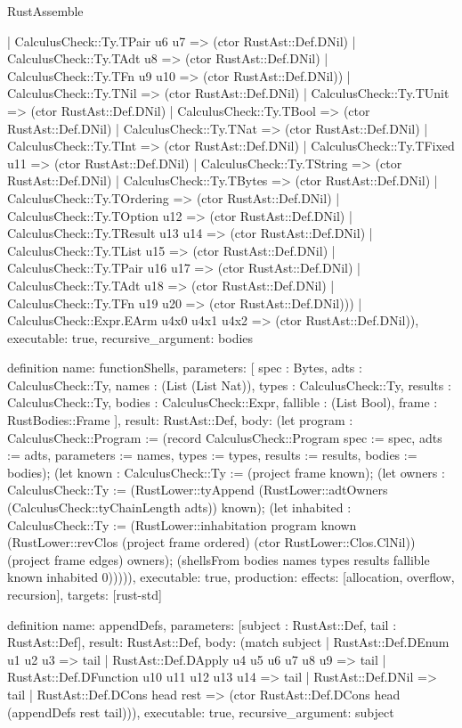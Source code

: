 \begin{lexlean}{RustAssemble}
\begin{semanticmodule}
{          | CalculusCheck::Ty.TPair u6 u7 => (ctor RustAst::Def.DNil)
          | CalculusCheck::Ty.TAdt u8 => (ctor RustAst::Def.DNil)
          | CalculusCheck::Ty.TFn u9 u10 => (ctor RustAst::Def.DNil))
        | CalculusCheck::Ty.TNil => (ctor RustAst::Def.DNil)
        | CalculusCheck::Ty.TUnit => (ctor RustAst::Def.DNil)
        | CalculusCheck::Ty.TBool => (ctor RustAst::Def.DNil)
        | CalculusCheck::Ty.TNat => (ctor RustAst::Def.DNil)
        | CalculusCheck::Ty.TInt => (ctor RustAst::Def.DNil)
        | CalculusCheck::Ty.TFixed u11 => (ctor RustAst::Def.DNil)
        | CalculusCheck::Ty.TString => (ctor RustAst::Def.DNil)
        | CalculusCheck::Ty.TBytes => (ctor RustAst::Def.DNil)
        | CalculusCheck::Ty.TOrdering => (ctor RustAst::Def.DNil)
        | CalculusCheck::Ty.TOption u12 => (ctor RustAst::Def.DNil)
        | CalculusCheck::Ty.TResult u13 u14 => (ctor RustAst::Def.DNil)
        | CalculusCheck::Ty.TList u15 => (ctor RustAst::Def.DNil)
        | CalculusCheck::Ty.TPair u16 u17 => (ctor RustAst::Def.DNil)
        | CalculusCheck::Ty.TAdt u18 => (ctor RustAst::Def.DNil)
        | CalculusCheck::Ty.TFn u19 u20 => (ctor RustAst::Def.DNil)))
    | CalculusCheck::Expr.EArm u4x0 u4x1 u4x2 => (ctor RustAst::Def.DNil)),
  executable: true,
  recursive_argument: bodies
}

definition{
  name: functionShells,
  parameters: [
    spec : Bytes,
    adts : CalculusCheck::Ty,
    names : (List (List Nat)),
    types : CalculusCheck::Ty,
    results : CalculusCheck::Ty,
    bodies : CalculusCheck::Expr,
    fallible : (List Bool),
    frame : RustBodies::Frame
  ],
  result: RustAst::Def,
  body: (let program : CalculusCheck::Program := (record CalculusCheck::Program {spec := spec, adts := adts, parameters := names, types := types, results := results, bodies := bodies}); (let known : CalculusCheck::Ty := (project frame known); (let owners : CalculusCheck::Ty := (RustLower::tyAppend (RustLower::adtOwners (CalculusCheck::tyChainLength adts)) known); (let inhabited : CalculusCheck::Ty := (RustLower::inhabitation program known (RustLower::revClos (project frame ordered) (ctor RustLower::Clos.ClNil)) (project frame edges) owners); (shellsFrom bodies names types results fallible known inhabited 0))))),
  executable: true,
  production: {effects: [allocation, overflow, recursion], targets: [rust-std]}
}

definition{
  name: appendDefs,
  parameters: [subject : RustAst::Def, tail : RustAst::Def],
  result: RustAst::Def,
  body: (match subject
    | RustAst::Def.DEnum u1 u2 u3 => tail
    | RustAst::Def.DApply u4 u5 u6 u7 u8 u9 => tail
    | RustAst::Def.DFunction u10 u11 u12 u13 u14 => tail
    | RustAst::Def.DNil => tail
    | RustAst::Def.DCons head rest => (ctor RustAst::Def.DCons head (appendDefs rest tail))),
  executable: true,
  recursive_argument: subject
}


\end{semanticmodule}
\end{lexlean}
